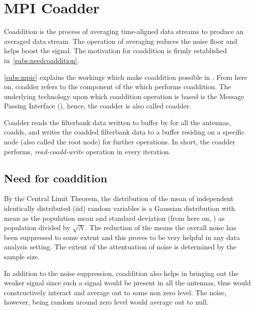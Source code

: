 \section {MPI Coadder}

\par Coaddition is the process of averaging time-aligned data streams to produce an averaged data stream. The operation of averaging reduces the noise floor and helps boost the signal.
The motivation for coaddition is firmly established in~\autoref{subs:needcoaddition}. 

\par \autoref{subs:mpic} explains the workings which make coaddition possible in \vf. 
From here on, coadder refers to the component of the \vf which performs coaddition. The underlying technology upon which coaddition operation is based is the Message Passing Interface (\mpi), hence, the coadder is also called \mpi coadder.

\par Coadder reads the filterbank data written to \dada buffer by \pb for all the antennas, coadds, and writes the coadded filterbank data to a \dada buffer residing on a specific node (also called the root node) for further operations. 
In short, the coadder performs, \emph{read-coadd-write} operation in every iteration.

\subsection {Need for coaddition}
\label{ssub:needcoaddition}
\par By the Central Limit Theorem, the distribution of the mean of independent identically distributed (iid) random variables is a Gaussian distribution with mean as the population mean and standard deviation (from here on, \sd) as population \sd divided by $\sqrt{N}$.
The reduction of the \sd means the overall noise has been suppressed to some extent and this proves to be very helpful in any data analysis setting. The extent of the attentuation of noise is determined by the sample size.

\par In addition to the noise suppression, coaddition also helps in bringing out the weaker signal since such a signal would be present in all the antennas, thus would constructively interact and average out to some non zero level. The noise, however, being random around zero level would average out to null.

